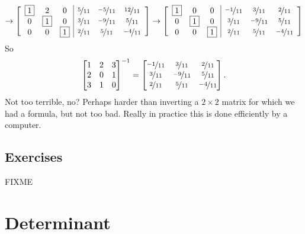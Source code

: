 \begin{equation*}
\to
\left[
\begin{array}{ccc|ccc}
\boxed{1} & 2 & 0 & \nicefrac{5}{11} & \nicefrac{-5}{11} & \nicefrac{12}{11} \\
0 & \boxed{1} & 0 & \nicefrac{3}{11} & \nicefrac{-9}{11} & \nicefrac{5}{11} \\
0 & 0 & \boxed{1} & \nicefrac{2}{11} & \nicefrac{5}{11} & \nicefrac{-4}{11}
\end{array}
\right]
\to
\left[
\begin{array}{ccc|ccc}
\boxed{1} & 0 & 0 & \nicefrac{-1}{11} & \nicefrac{3}{11} & \nicefrac{2}{11} \\
0 & \boxed{1} & 0 & \nicefrac{3}{11} & \nicefrac{-9}{11} & \nicefrac{5}{11} \\
0 & 0 & \boxed{1} & \nicefrac{2}{11} & \nicefrac{5}{11} & \nicefrac{-4}{11}
\end{array}
\right]
\end{equation*}
So
\begin{equation*}
{\begin{bmatrix}
1 & 2 & 3 \\
2 & 0 & 1 \\
3 & 1 & 0
\end{bmatrix}}^{-1}
=
\begin{bmatrix}
\nicefrac{-1}{11} & \nicefrac{3}{11} & \nicefrac{2}{11} \\
\nicefrac{3}{11} & \nicefrac{-9}{11} & \nicefrac{5}{11} \\
\nicefrac{2}{11} & \nicefrac{5}{11} & \nicefrac{-4}{11}
\end{bmatrix} .
\end{equation*}
Not too terrible, no?  Perhaps harder than inverting a $2 \times 2$ matrix
for which we had a formula, but not too bad.  Really in practice this 
is done efficiently by a computer.

\subsection{Exercises}

FIXME


\sectionnewpage
\section{Determinant}
\label{det:section}

